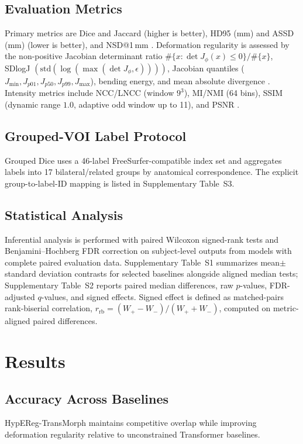 \documentclass[11pt,a4paper]{article}
\begin{document}
\subsection{Evaluation Metrics}
Primary metrics are Dice and Jaccard (higher is better), HD95 (mm) and ASSD (mm) (lower is better), and NSD@1\,mm \citep{dice1945,heimann2009,nikolov2018}. Deformation regularity is assessed by the non-positive Jacobian determinant ratio \(\#\{x:\det J_\phi(x)\le 0\}/\#\{x\}\), SDlogJ \(\left(\mathrm{std}(\log(\max(\det J_\phi,\epsilon)))\right)\), Jacobian quantiles (\(J_{\min}, J_{p01}, J_{p50}, J_{p99}, J_{\max}\)), bending energy, and mean absolute divergence \citep{bookstein1989tps,mok2020lapirn}. Intensity metrics include NCC/LNCC (window \(9^3\)), MI/NMI (64 bins), SSIM (dynamic range \(1.0\), adaptive odd window up to 11), and PSNR \citep{studholme1999nmi,wang2004ssim}.

\subsection{Grouped-VOI Label Protocol}
Grouped Dice uses a 46-label FreeSurfer-compatible index set and aggregates labels into 17 bilateral/related groups by anatomical correspondence. The explicit group-to-label-ID mapping is listed in Supplementary Table~S3.

\subsection{Statistical Analysis}
Inferential analysis is performed with paired Wilcoxon signed-rank tests \citep{wilcoxon1945} and Benjamini--Hochberg FDR correction \citep{bh1995} on subject-level outputs from models with complete paired evaluation data. Supplementary Table~S1 summarizes mean\(\pm\)standard deviation contrasts for selected baselines alongside aligned median tests; Supplementary Table~S2 reports paired median differences, raw \(p\)-values, FDR-adjusted \(q\)-values, and signed effects. Signed effect is defined as matched-pairs rank-biserial correlation, \(r_{\mathrm{rb}}=(W_+-W_-)/(W_++W_-)\), computed on metric-aligned paired differences.

\section{Results}

\subsection{Accuracy Across Baselines}
HypEReg-TransMorph maintains competitive overlap while improving deformation regularity relative to unconstrained Transformer baselines.
\end{document}
